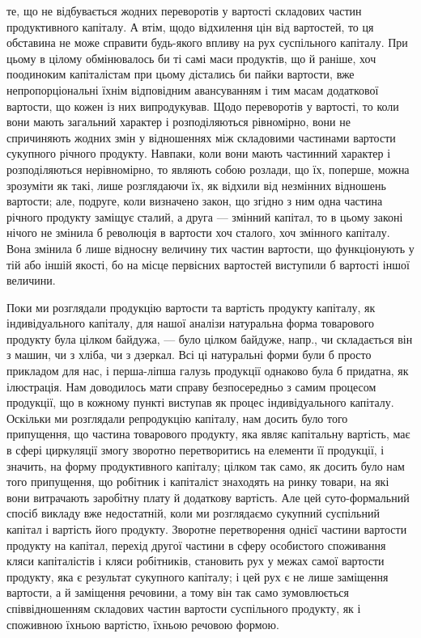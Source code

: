 \parcont{}  %
те, що не відбувається жодних переворотів у вартості складових частин
продуктивного капіталу. А втім, щодо відхилення цін від вартостей, то
ця обставина не може справити будь-якого впливу на рух суспільного
капіталу. При цьому в цілому обмінювалось би ті самі маси продуктів,
що й раніше, хоч поодиноким капіталістам при цьому дістались би пайки
вартости, вже непропорціональні їхнім відповідним авансуванням і тим масам
додаткової вартости, що кожен із них випродукував. Щодо переворотів
у вартості, то коли вони мають загальний характер і розподіляються
рівномірно, вони не спричиняють жодних змін у відношеннях між
складовими частинами вартости сукупного річного продукту. Навпаки, коли
вони мають частинний характер і розподіляються нерівномірно, то являють
собою розлади, що їх, поперше, можна зрозуміти як такі, лише розглядаючи
їх, як відхили від незмінних відношень вартости; але, подруге,
коли визначено закон, що згідно з ним одна частина річного продукту заміщує
сталий, а друга — змінний капітал, то в цьому законі нічого не
змінила б революція в вартости хоч сталого, хоч змінного капіталу. Вона
змінила б лише відносну величину тих частин вартости, що функціонують
у тій або іншій якості, бо на місце первісних вартостей виступили
б вартості іншої величини.

Поки ми розглядали продукцію вартости та вартість продукту капіталу,
як індивідуального капіталу, для нашої аналізи натуральна форма
товарового продукту була цілком байдужа, — було цілком байдуже, напр.,
чи складається він з машин, чи з хліба, чи з дзеркал. Всі ці натуральні
форми були б просто прикладом для нас, і перша-ліпша галузь продукції
однаково була б придатна, як ілюстрація. Нам доводилось мати
справу безпосередньо з самим процесом продукції, що в кожному пункті
виступав як процес індивідуального капіталу. Оскільки ми розглядали
репродукцію капіталу, нам досить було того припущення, що частина
товарового продукту, яка являє капітальну вартість, має в сфері циркуляції
змогу зворотно перетворитись на елементи її продукції, і значить,
на форму продуктивного капіталу; цілком так само, як досить було нам
того припущення, що робітник і капіталіст знаходять на ринку товари,
на які вони витрачають заробітну плату й додаткову вартість. Але цей
суто-формальний спосіб викладу вже недостатній, коли ми розглядаємо
сукупний суспільний капітал і вартість його продукту. Зворотне перетворення
однієї частини вартости продукту на капітал, перехід другої частини в
сферу особистого споживання кляси капіталістів і кляси робітників, становить
рух у межах самої вартости продукту, яка є результат сукупного
капіталу; і цей рух є не лише заміщення вартости, а й заміщення речовини,
а тому він так само зумовлюється співвідношенням складових
частин вартости суспільного продукту, як і споживною їхньою вартістю,
їхньою речовою формою.
\label{original-302-1}

